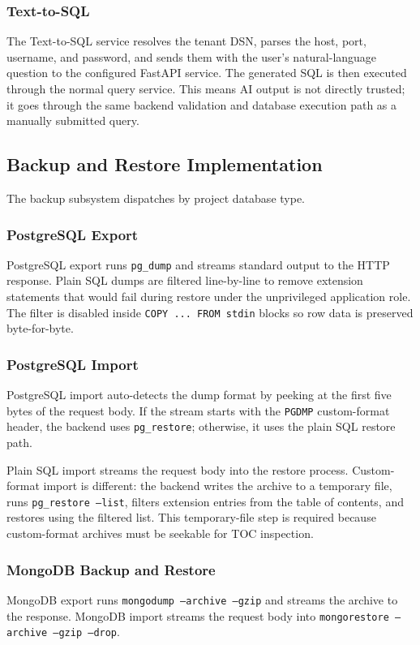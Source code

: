 \subsubsection{Text-to-SQL}
The Text-to-SQL service resolves the tenant DSN, parses the host, port, username, and password, and sends them with the user's natural-language question to the configured FastAPI service. The generated SQL is then executed through the normal query service. This means AI output is not directly trusted; it goes through the same backend validation and database execution path as a manually submitted query.

\subsection{Backup and Restore Implementation}

The backup subsystem dispatches by project database type.

\subsubsection{PostgreSQL Export}
PostgreSQL export runs \texttt{pg\_dump} and streams standard output to the HTTP response. Plain SQL dumps are filtered line-by-line to remove extension statements that would fail during restore under the unprivileged application role. The filter is disabled inside \texttt{COPY ... FROM stdin} blocks so row data is preserved byte-for-byte.

\subsubsection{PostgreSQL Import}
PostgreSQL import auto-detects the dump format by peeking at the first five bytes of the request body. If the stream starts with the \texttt{PGDMP} custom-format header, the backend uses \texttt{pg\_restore}; otherwise, it uses the plain SQL restore path.

Plain SQL import streams the request body into the restore process. Custom-format import is different: the backend writes the archive to a temporary file, runs \texttt{pg\_restore --list}, filters extension entries from the table of contents, and restores using the filtered list. This temporary-file step is required because custom-format archives must be seekable for TOC inspection.

\subsubsection{MongoDB Backup and Restore}
MongoDB export runs \texttt{mongodump --archive --gzip} and streams the archive to the response. MongoDB import streams the request body into \texttt{mongorestore --archive --gzip --drop}.

